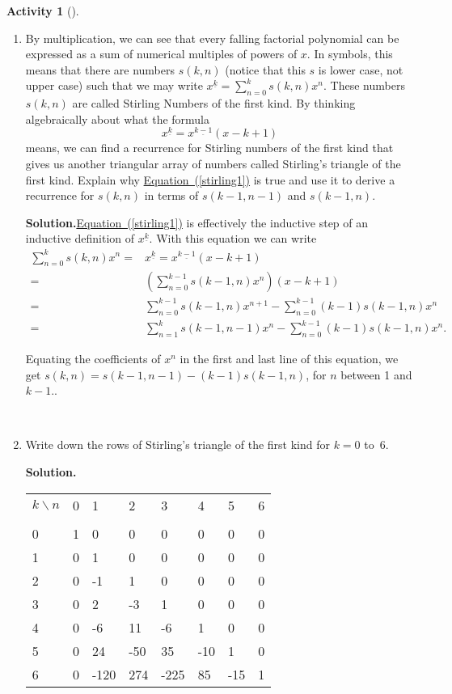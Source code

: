 \documentclass[10pt,]{book}
\theoremstyle{plain}
\theoremstyle{definition}
\newtheorem{activity}[project]{Activity}
\numberwithin{equation}{chapter}
\newcommand{\hrulethin}  {\noalign{\hrule height 0.04em}}
\newcommand{\amp}{&}
\begin{document}
\begin{activity}[]\label{Stirlingfirst}
~\par
\begin{enumerate}[label=(\alph*)]
 \item By multiplication, we can see that every falling factorial polynomial can be expressed as a sum of numerical multiples of powers of \(x\). In symbols, this means that there are numbers \(s(k,n)\) (notice that this \(s\) is lower case, not upper case) such that we may write \(x^{\underline{k}} =
\sum_{n=0}^k s(k,n)x^n\). These numbers \(s(k,n)\) are called Stirling Numbers of the first kind. By thinking algebraically about what the formula%
\begin{equation}
x^{\underline{k}} =
x^{\underline{k-1}}(x-k+1)\label{stirling1}
\end{equation}
means, we can find a recurrence for Stirling numbers of the first kind that gives us another triangular array of numbers called Stirling's triangle of the first kind. Explain why \hyperref[stirling1]{Equation~(\ref{stirling1})} is true and use it to derive a recurrence for \(s(k,n)\) in terms of \(s(k-1,n-1)\) and \(s(k-1,n)\).%
\par\medskip\noindent%
\textbf{Solution.}\quad \hyperref[stirling1]{Equation~(\ref{stirling1})} is effectively the inductive step of an inductive definition of \(x^{\underline{k}}\). With this equation we can write%
\begin{align*}
\sum_{n=0}^k s(k,n)x^n =\amp x^{\underline{k}} =
x^{\underline{k-1}}(x-k+1)\\
=\amp \left(\sum_{n=0}^{k-1}s(k-1,n)x^n\right)(x-k+1)\\
=\amp \sum_{n=0}^{k-1}s(k-1,n)x^{n+1} - \sum_{n=0}^{k-1}(k-1)s(k-1,n)x^n\\
=\amp \sum_{n=1}^k s(k-1,n-1)x^n-\sum_{n=0}^{k-1}(k-1)s(k-1,n)x^n.
\end{align*}
%
\par
Equating the coefficients of \(x^n\) in the first and last line of this equation, we get \(s(k,n) = s(k-1,n-1) -(k-1)s(k-1,n)\), for \(n\) between 1 and \(k-1\)..%

~\par
\item Write down the rows of Stirling's triangle of the first kind for \(k=0\) to~6.%
\par\medskip\noindent%
\textbf{Solution.}\quad \begin{tabular}{llllllll}
\(k\backslash n\)&0&1&2&3&4&5&6\tabularnewline[0pt]
&&&&&&&\tabularnewline\hrulethin
0&1&0&0&0&0&0&0\tabularnewline[0pt]
1&0&1&0&0&0&0&0\tabularnewline[0pt]
2&0&-1&1&0&0&0&0\tabularnewline[0pt]
3&0&2&-3&1&0&0&0\tabularnewline[0pt]
4&0&-6&11&-6&1&0&0\tabularnewline[0pt]
5&0&24&-50&35&-10&1&0\tabularnewline[0pt]
6&0&-120&274&-225&85&-15&1
\end{tabular}

\end{enumerate}
\end{activity}
\end{document}
